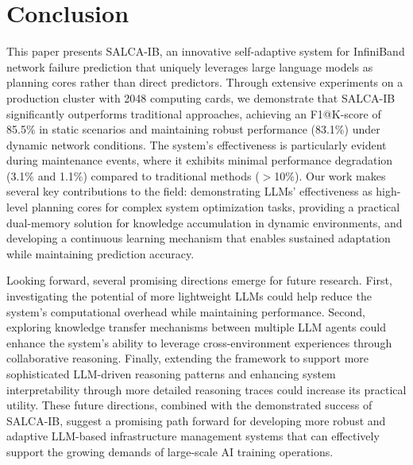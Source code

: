 \documentclass[conference]{IEEEtran}
\begin{document}
\section{Conclusion}

This paper presents SALCA-IB, an innovative self-adaptive system for InfiniBand network failure prediction that uniquely leverages large language models as planning cores rather than direct predictors. Through extensive experiments on a production cluster with 2048 computing cards, we demonstrate that SALCA-IB significantly outperforms traditional approaches, achieving an F1@K-score of 85.5\% in static scenarios and maintaining robust performance (83.1\%) under dynamic network conditions. The system's effectiveness is particularly evident during maintenance events, where it exhibits minimal performance degradation (3.1\% and 1.1\%) compared to traditional methods ($>$10\%). Our work makes several key contributions to the field: demonstrating LLMs' effectiveness as high-level planning cores for complex system optimization tasks, providing a practical dual-memory solution for knowledge accumulation in dynamic environments, and developing a continuous learning mechanism that enables sustained adaptation while maintaining prediction accuracy.

Looking forward, several promising directions emerge for future research. First, investigating the potential of more lightweight LLMs could help reduce the system's computational overhead while maintaining performance. Second, exploring knowledge transfer mechanisms between multiple LLM agents could enhance the system's ability to leverage cross-environment experiences through collaborative reasoning. Finally, extending the framework to support more sophisticated LLM-driven reasoning patterns and enhancing system interpretability through more detailed reasoning traces could increase its practical utility. These future directions, combined with the demonstrated success of SALCA-IB, suggest a promising path forward for developing more robust and adaptive LLM-based infrastructure management systems that can effectively support the growing demands of large-scale AI training operations.
\end{document}
